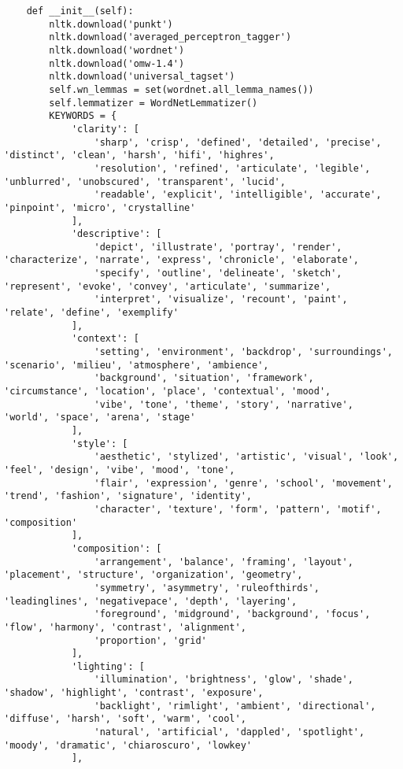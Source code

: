 \begin{verbatim}
    def __init__(self):
        nltk.download('punkt')
        nltk.download('averaged_perceptron_tagger')
        nltk.download('wordnet')
        nltk.download('omw-1.4')
        nltk.download('universal_tagset')
        self.wn_lemmas = set(wordnet.all_lemma_names())
        self.lemmatizer = WordNetLemmatizer()
        KEYWORDS = {
            'clarity': [
                'sharp', 'crisp', 'defined', 'detailed', 'precise', 'distinct', 'clean', 'harsh', 'hifi', 'highres',
                'resolution', 'refined', 'articulate', 'legible', 'unblurred', 'unobscured', 'transparent', 'lucid',
                'readable', 'explicit', 'intelligible', 'accurate', 'pinpoint', 'micro', 'crystalline'
            ],
            'descriptive': [
                'depict', 'illustrate', 'portray', 'render', 'characterize', 'narrate', 'express', 'chronicle', 'elaborate',
                'specify', 'outline', 'delineate', 'sketch', 'represent', 'evoke', 'convey', 'articulate', 'summarize',
                'interpret', 'visualize', 'recount', 'paint', 'relate', 'define', 'exemplify'
            ],
            'context': [
                'setting', 'environment', 'backdrop', 'surroundings', 'scenario', 'milieu', 'atmosphere', 'ambience',
                'background', 'situation', 'framework', 'circumstance', 'location', 'place', 'contextual', 'mood',
                'vibe', 'tone', 'theme', 'story', 'narrative', 'world', 'space', 'arena', 'stage'
            ],
            'style': [
                'aesthetic', 'stylized', 'artistic', 'visual', 'look', 'feel', 'design', 'vibe', 'mood', 'tone',
                'flair', 'expression', 'genre', 'school', 'movement', 'trend', 'fashion', 'signature', 'identity',
                'character', 'texture', 'form', 'pattern', 'motif', 'composition'
            ],
            'composition': [
                'arrangement', 'balance', 'framing', 'layout', 'placement', 'structure', 'organization', 'geometry',
                'symmetry', 'asymmetry', 'ruleofthirds', 'leadinglines', 'negativepace', 'depth', 'layering',
                'foreground', 'midground', 'background', 'focus', 'flow', 'harmony', 'contrast', 'alignment',
                'proportion', 'grid'
            ],
            'lighting': [
                'illumination', 'brightness', 'glow', 'shade', 'shadow', 'highlight', 'contrast', 'exposure',
                'backlight', 'rimlight', 'ambient', 'directional', 'diffuse', 'harsh', 'soft', 'warm', 'cool',
                'natural', 'artificial', 'dappled', 'spotlight', 'moody', 'dramatic', 'chiaroscuro', 'lowkey'
            ],

\end{verbatim}

